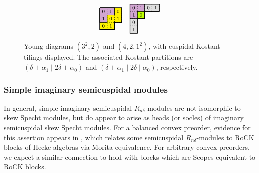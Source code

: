 \documentclass[Unicode,ALCO]{cedram}
\newcommand{\0}{{\bar 0}}
\newcommand{\hackcenter}[1]{
 \xy (0,0)*{#1}; \endxy}
\begin{document}
\begin{exam}
\begin{figure}
\begin{align*}
{}
\hackcenter{
\begin{tikzpicture}[scale=0.37]
\draw[thick, fill=yellow] (0,0)--(3,0)--(3,-2)--(2,-2)--(2,-3)--(0,-3)--(0,0);
\draw[thick,  fill=violet!35]  (0,0)--(2,0)--(2,-1)--(1,-1)--(1,-2)--(0,-2)--(0,0);
\draw[thick, dotted] (1,0)--(1,-3);
\draw[thick, dotted] (2,0)--(2,-2);
\draw[thick, dotted] (3,0)--(3,-2);
\draw[thick, dotted] (0,-1)--(3,-1);
\draw[thick, dotted] (0,-2)--(3,-2);
\node at (0.5,-0.5){$\scriptstyle0 $};
\node at (1.5,-0.5){$\scriptstyle1 $};
\node at (2.5,-0.5){$\scriptstyle0 $};
\node at (1.5,-2.5){$\scriptstyle1 $};
\node at (0.5,-2.5){$\scriptstyle0 $};
\node at (2.5,-1.5){$\scriptstyle1 $};
\node at (1.5,-1.5){$\scriptstyle0 $};
\node at (0.5,-1.5){$\scriptstyle1 $};
\draw[thick] (0,0)--(3,0)--(3,-2)--(2,-2)--(2,-3)--(0,-3)--(0,0);
\end{tikzpicture}
}
\;\;\;\;
\hackcenter{
\begin{tikzpicture}[scale=0.37]
\draw[thick, fill=lightgray!50] (0,0)--(4,0)--(4,-1)--(2,-1)--(2,-2)--(1,-2)--(1,-4)--(0,-4)--(0,0);
\draw[thick,  fill=violet!35]  (0,0)--(2,0)--(2,-1)--(1,-1)--(1,-2)--(0,-2)--(0,0);
\draw[thick, fill=lime] (1,-1)--(2,-1)--(2,-2)--(1,-2)--(1,-1);
\draw[thick, dotted] (1,0)--(1,-2);
\draw[thick, dotted] (2,0)--(2,-2);
\draw[thick, dotted] (3,0)--(3,-1);
\draw[thick, dotted] (4,0)--(4,-1);
\draw[thick, dotted] (0,-1)--(3,-1);
\draw[thick, dotted] (0,-2)--(1,-2);
\draw[thick, dotted] (0,-3)--(1,-3);
\node at (0.5,-0.5){$\scriptstyle0 $};
\node at (1.5,-0.5){$\scriptstyle1 $};
\node at (2.5,-0.5){$\scriptstyle0 $};
\node at (3.5,-0.5){$\scriptstyle1 $};
\node at (0.5,-3.5){$\scriptstyle1 $};
\node at (0.5,-2.5){$\scriptstyle0 $};
\node at (1.5,-1.5){$\scriptstyle0 $};
\node at (0.5,-1.5){$\scriptstyle1 $};
\draw[thick]  (0,0)--(4,0)--(4,-1)--(2,-1)--(2,-2)--(1,-2)--(1,-4)--(0,-4)--(0,0);
\end{tikzpicture}
}
\end{align*}
\caption{Young diagrams \((3^2,2)\) and \( (4,2,1^2)\), with cuspidal Kostant tilings displayed. The associated Kostant partitions are \((\delta + \alpha_1 \mid 2\delta + \alpha_0)\) and \((\delta + \alpha_1 \mid 2 \delta \mid \alpha_0)\), respectively.}
\label{fig:3resYD}      
\end{figure}

\end{exam}



\subsubsection{Simple imaginary semicuspidal modules}
In general, simple imaginary semicuspidal \(R_{n \delta}\)-modules are not isomorphic to skew Specht modules, but do appear to arise as heads (or socles) of imaginary semicuspidal skew Specht modules. For a balanced convex preorder, evidence for this assertion appears in \cite{EvKlBloSym}, which relates some semicuspidal \(R_{n \delta}\)-modules to RoCK blocks of Hecke algebras via Morita equivalence. For arbitrary convex preorders, we expect a similar connection to hold with blocks which are Scopes equivalent to RoCK blocks.
\end{document}
